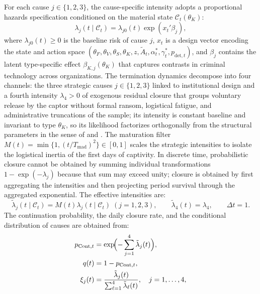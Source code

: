 \documentclass[ecta,nameyear,draft]{econsocart}
\theoremstyle{plain}
\theoremstyle{definition}
\newcommand{\1}{\mathbf{1}}
\begin{document}
For each cause $j\in\{1,2,3\}$, the cause-specific intensity adopts a proportional hazards specification conditioned on the material state $\mathcal{C}_t(\theta_K)$:
\begin{equation}
\lambda_j(t\mid\mathcal{C}_t)=\lambda_{j0}(t)\exp(x_t'\beta_j),
\label{eq:lambda-j}
\end{equation}
where $\lambda_{j0}(t)\ge 0$ is the baseline risk of cause $j$, $x_t$ is a design vector encoding the state and action space $(\theta_F,\theta_V,\theta_S,\theta_K,z,\tilde{A}_t,\alpha_t^\ast,\gamma_t^\ast,p_{\mathrm{det},t})$, and $\beta_j$ contains the latent type-specific effect $\beta_{K,j}(\theta_K)$ that captures contrasts in criminal technology across organizations. The termination dynamics decompose into four channels: the three strategic causes $j\in\{1,2,3\}$ linked to institutional design and a fourth intensity $\lambda_4>0$ of exogenous residual closure that groups voluntary release by the captor without formal ransom, logistical fatigue, and administrative truncations of the sample; its intensity is constant baseline and invariant to type $\theta_K$, so its likelihood factorizes orthogonally from the structural parameters in the sense of \citet{Lancaster1990} and \citet{AbbringVanDenBerg2003}. The maturation filter $M(t)=\min\{1,(t/T_{\mathrm{mad}})^2\}\in[0,1]$ scales the strategic intensities to isolate the logistical inertia of the first days of captivity. In discrete time, probabilistic closure cannot be obtained by summing individual transformations $1-\exp(-\lambda_j)$ because that sum may exceed unity; closure is obtained by first aggregating the intensities and then projecting period survival through the aggregated exponential. The effective intensities are:
\begin{equation}
\tilde{\lambda}_j(t\mid\mathcal{C}_t)=M(t)\lambda_j(t\mid\mathcal{C}_t)\;(j=1,2,3),\qquad\tilde{\lambda}_4(t)=\lambda_4,\qquad\Delta t=1.
\label{eq:hj}
\end{equation}
The continuation probability, the daily closure rate, and the conditional distribution of causes are obtained from:
\begin{align}
p_{\mathrm{Cont},t} &= \exp\!\Bigl(-\sum_{j=1}^{4}\tilde{\lambda}_j(t)\Bigr),\label{eq:pCont}\\
q(t) &= 1-p_{\mathrm{Cont},t},\label{eq:q}\\
\xi_j(t) &= \frac{\tilde{\lambda}_j(t)}{\sum_{\ell=1}^{4}\tilde{\lambda}_\ell(t)},\quad j=1,\ldots,4,\label{eq:xi}
\end{align}
\end{document}

